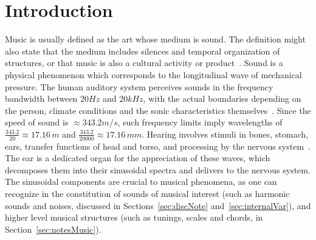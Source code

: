 \section{Introduction}\label{sec:level1}
Music is usually defined as the art whose medium is sound.
The definition might also state that the medium includes silences
and temporal organization of structures, or that music
is also a cultural activity or product~\cite{}.
Sound is a physical phenomenon which corresponds to the longitudinal wave of mechanical pressure.
The human auditory system perceives sounds in the frequency bandwidth between $20Hz$ and $20kHz$,
with the actual boundaries depending on the person,
climate conditions and the sonic characteristics themselves~\cite{Roederer}.
Since the speed of sound is $\approx 343.2 m/s$,
such frequency limits imply wavelengths of $\frac{343.2}{20} \approx 17.16\,m$ and
$\frac{343.2}{20000} \approx 17.16\,mm$.
Hearing involves stimuli in bones, stomach, ears,
transfer functions of head and torso,
and processing by the nervous system~\cite{Roederer}.
The ear is a dedicated organ for the appreciation of these waves,
which decomposes them into their sinusoidal spectra and delivers to the nervous system.
The sinusoidal components are crucial to musical phenomena,
as one can recognize in the constitution of sounds of musical interest
(such as harmonic sounds and noises, discussed in Sections~\ref{sec:discNote} and~\ref{sec:internalVar}),
and higher level musical structures (such as tunings, scales and chords, in Section~\ref{sec:notesMusic}).

